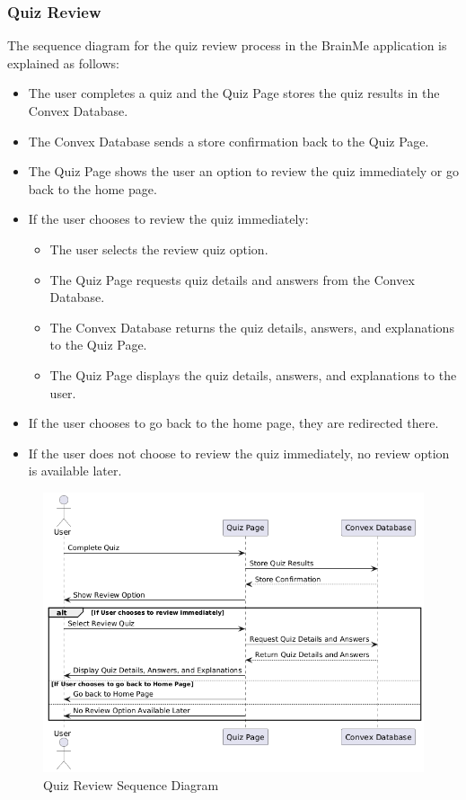 \subsubsection{Quiz Review}

The sequence diagram for the quiz review process in the BrainMe application is explained as follows:

\begin{itemize}
    \item The user completes a quiz and the Quiz Page stores the quiz results in the Convex Database.
    \item The Convex Database sends a store confirmation back to the Quiz Page.
    \item The Quiz Page shows the user an option to review the quiz immediately or go back to the home page.
    \item If the user chooses to review the quiz immediately:
    \begin{itemize}
        \item The user selects the review quiz option.
        \item The Quiz Page requests quiz details and answers from the Convex Database.
        \item The Convex Database returns the quiz details, answers, and explanations to the Quiz Page.
        \item The Quiz Page displays the quiz details, answers, and explanations to the user.
    \end{itemize}
    \item If the user chooses to go back to the home page, they are redirected there.
    \item If the user does not choose to review the quiz immediately, no review option is available later.
\end{itemize}

\begin{figure}[H]
    \centering
    \includegraphics[width=1\linewidth, height=0.52\textheight]{Sequence Diagrams/Quiz Review.png}
    \caption{Quiz Review Sequence Diagram}
\end{figure}


